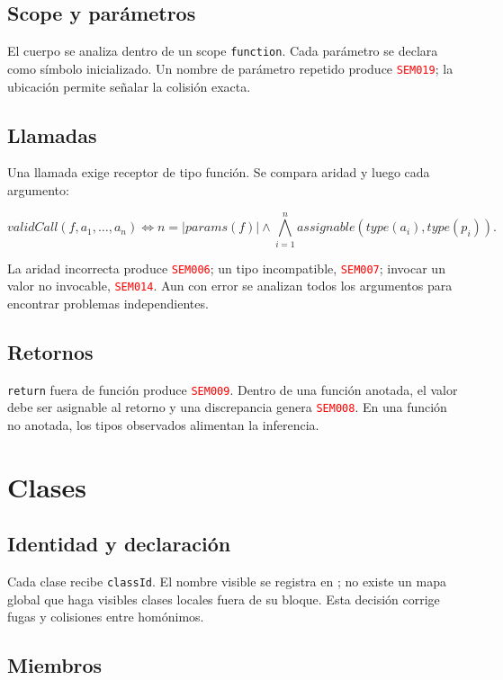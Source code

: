 \documentclass[11pt,letterpaper,oneside]{report}
\newcommand{\archivo}[1]{\path{#1}}
\newcommand{\codigo}[1]{\texttt{#1}}
\newcommand{\diag}[1]{\textcolor{red}{\texttt{#1}}}
\begin{document}
\subsection{Scope y parámetros}

El cuerpo se analiza dentro de un scope \codigo{function}. Cada parámetro se declara
como símbolo inicializado. Un nombre de parámetro repetido produce \diag{SEM019}; la
ubicación permite señalar la colisión exacta.

\subsection{Llamadas}

Una llamada exige receptor de tipo función. Se compara aridad y luego cada argumento:

\[
validCall(f,a_1,\ldots,a_n)\iff
n=|params(f)|\land
\bigwedge_{i=1}^{n} assignable(type(a_i),type(p_i)).
\]

La aridad incorrecta produce \diag{SEM006}; un tipo incompatible,
\diag{SEM007}; invocar un valor no invocable, \diag{SEM014}. Aun con error se analizan
todos los argumentos para encontrar problemas independientes.

\subsection{Retornos}

\codigo{return} fuera de función produce \diag{SEM009}. Dentro de una función
anotada, el valor debe ser asignable al retorno y una discrepancia genera
\diag{SEM008}. En una función no anotada, los tipos observados alimentan la inferencia.

\section{Clases}

\subsection{Identidad y declaración}

Cada clase recibe \codigo{classId}. El nombre visible se registra en
\archivo{ScopeManager}; no existe un mapa global que haga visibles clases locales
fuera de su bloque. Esta decisión corrige fugas y colisiones entre homónimos.

\subsection{Miembros}
\end{document}
